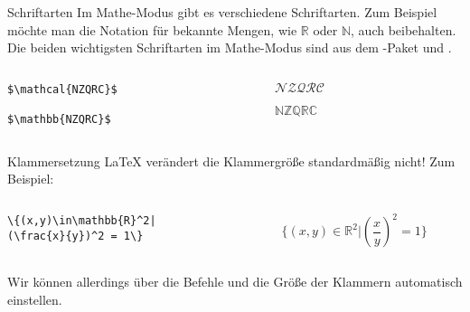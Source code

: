 \begin{frame}[fragile]{Schriftarten}
Im Mathe-Modus gibt es verschiedene Schriftarten. Zum Beispiel möchte man die Notation für bekannte Mengen, wie $\mathbb{R}$ oder $\mathbb{N}$, auch beibehalten. Die beiden wichtigsten Schriftarten im Mathe-Modus sind  aus dem -Paket und .
\begin{columns}
\begin{column}{0.55\textwidth}
\begin{codeblock}
\begin{verbatim}
$\mathcal{NZQRC}$

$\mathbb{NZQRC}$
\end{verbatim}
\end{codeblock}
\end{column}
\begin{column}{0.35\textwidth}
$\mathcal{NZQRC}$

\medskip
$\mathbb{NZQRC}$
\end{column}
\end{columns}
\end{frame}


\begin{frame}[fragile]{Klammersetzung}
\LaTeX{} verändert die Klammergröße standardmäßig \alert{nicht}! Zum Beispiel: 
\begin{columns}
\begin{column}{0.55\textwidth}
\begin{codeblock}
\begin{verbatim}
\{(x,y)\in\mathbb{R}^2|
(\frac{x}{y})^2 = 1\}
\end{verbatim}
\end{codeblock}
\end{column}
\begin{column}{0.35\textwidth}
\[
    \{(x,y)\in\mathbb{R}^2|(\frac{x}{y})^2 = 1\}
\]
\end{column}
\end{columns}

\medskip\pause
Wir können allerdings über die Befehle  und  die Größe der Klammern automatisch einstellen.
\end{frame}

